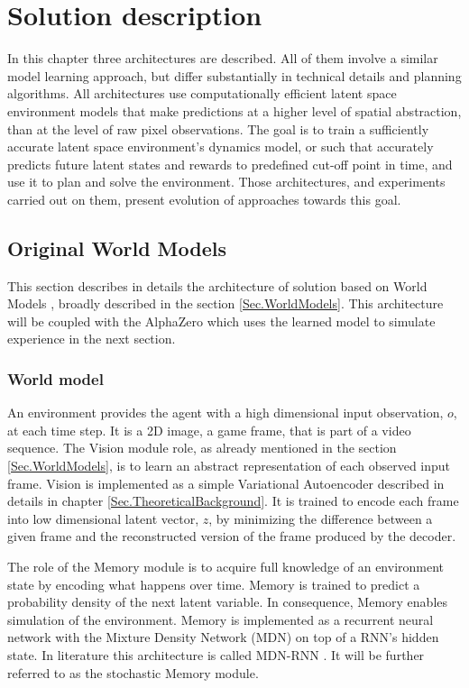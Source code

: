 \section{Solution description} \label{Sec.SolutionDescription}

In this chapter three architectures are described. All of them involve a similar model learning approach, but differ substantially in technical details and planning algorithms. All architectures use computationally efficient latent space environment models that make predictions at a higher level of spatial abstraction, than at the level of raw pixel observations. The goal is to train a sufficiently accurate latent space environment's dynamics model, or such that accurately predicts future latent states and rewards to predefined cut-off point in time, and use it to plan and solve the environment. Those architectures, and experiments carried out on them, present evolution of approaches towards this goal.

\subsection{Original World Models}

This section describes in details the architecture of solution based on World Models \cite{Algo.WorldModels}, broadly described in the section \ref{Sec.WorldModels}. This architecture will be coupled with the AlphaZero which uses the learned model to simulate experience in the next section.

\subsubsection{World model}

An environment provides the agent with a high dimensional input observation, $o$, at each time step. It is a 2D image, a game frame, that is part of a video sequence. The Vision module role, as already mentioned in the section \ref{Sec.WorldModels}, is to learn an abstract representation of each observed input frame. Vision is implemented as a simple Variational Autoencoder described in details in chapter \ref{Sec.TheoreticalBackground}. It is trained to encode each frame into low dimensional latent vector, $z$, by minimizing the difference between a given frame and the reconstructed version of the frame produced by the decoder.

The role of the Memory module is to acquire full knowledge of an environment state by encoding what happens over time. Memory is trained to predict a probability density of the next latent variable. In consequence, Memory enables simulation of the environment. Memory is implemented as a recurrent neural network with the Mixture Density Network (MDN) on top of a RNN's hidden state. In literature this architecture is called MDN-RNN \cite{Algo.MDNRNN}. It will be further referred to as the stochastic Memory module.

